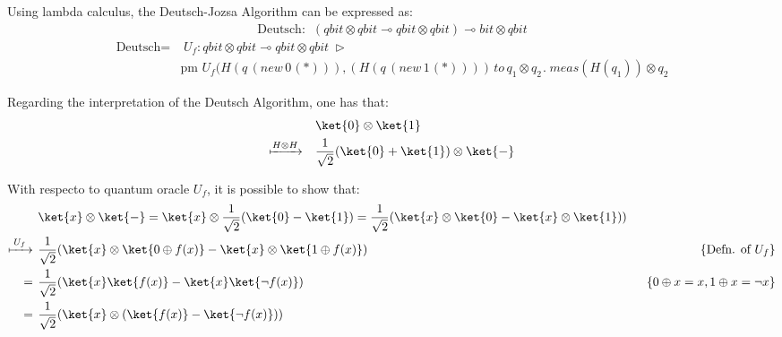 Using lambda calculus, the Deutsch-Jozsa Algorithm can be expressed as:
\begin{align*}
\text{Deutsch} :    \hspace{5pt} (\textit{qbit} \otimes \textit{qbit} \multimap \textit{qbit} \otimes \textit{qbit}) \multimap \textit{bit} \otimes \textit{qbit}
\end{align*}
\begin{align*}
\text{Deutsch} = & \hspace{3pt} U_{f}: \textit{qbit} \otimes \textit{qbit} \multimap \textit{qbit} \otimes \textit{qbit} \hspace{3pt} \triangleright \hspace{3pt}  \\ 
& \text{pm} \hspace{4pt}  U_{f}(H(q  \hspace{2pt}   ( \textit{new}   \hspace{2pt}  0 \hspace{1pt}(*))),(H(q  \hspace{2pt}   ( \textit{new}   \hspace{2pt}  1 \hspace{1pt}(*)))) \hspace{2pt}  \textit{to} \hspace{2pt} q_{1} \otimes q_{2} \hspace{1pt}. \hspace{3pt} \textit{meas} (H( q_{1})) \otimes q_{2}
 \end{align*}

Regarding the interpretation of the Deutsch Algorithm, one has that:
\begin{equation}
\begin{split}
 & \ket{0} \otimes \ket{1} \\
 \xmapsto{ H \otimes H} \quad & \frac{1}{\sqrt{2}}(\ket{0} + \ket{1}) \otimes \ket{-} \\
\end{split}
\end{equation}

With respecto to  quantum oracle $U_f$, it is possible to show that:
\begin{equation}
\begin{split}
  &\ket{x} \otimes \ket{-} =   \ket{x} \otimes \frac{1}{\sqrt{2}}(\ket{0} - \ket{1}) = \frac{1}{\sqrt{2}}(\ket{x} \otimes \ket{0} - \ket{x} \otimes \ket{1})) \\
  \xmapsto{ \hspace{2pt} U_{f} \hspace{2pt}} \hspace{4pt} &  \frac{1}{\sqrt{2}}(\ket{x} \otimes \ket{0 \oplus f(x)} - \ket{x} \otimes \ket{1 \oplus f(x)}) &\hspace{50pt} \{\text{Defn. of } U_f\} \\
  = \hspace{4pt}  & \frac{1}{\sqrt{2}}(\ket{x} \ket{f(x)} - \ket{x} \ket{\neg f(x)}) & \{0\oplus x=x, 1\oplus x = \neg x\} \\
  = \hspace{4pt}  & \frac{1}{\sqrt{2}}(\ket{x} \otimes (\ket{f(x)}-\ket{\neg f(x)}))
 \end{split}
\end{equation}

